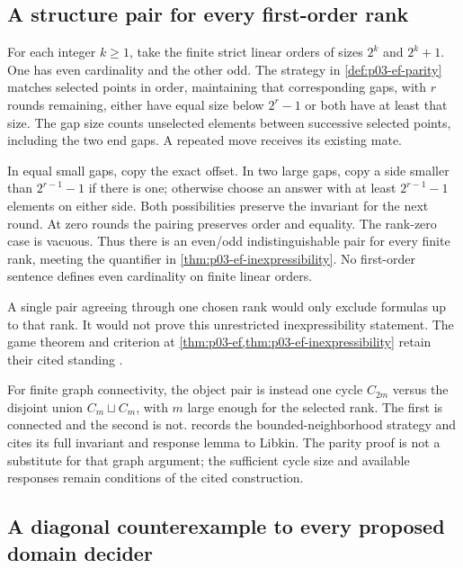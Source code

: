 \subsection{A structure pair for every first-order rank}
\label{sec:p14-counter-definability}

For each integer \(k\geq1\), take the finite strict linear orders of sizes
\(2^k\) and \(2^k+1\). One has even cardinality and the other odd.
The strategy in \cref{def:p03-ef-parity} matches selected points in order,
maintaining that corresponding gaps, with \(r\) rounds remaining, either
have equal size below \(2^r-1\) or both have at least that size.
The gap size counts unselected elements between successive selected points,
including the two end gaps. A repeated move receives its existing mate.

In equal small gaps, copy the exact offset. In two large gaps, copy a side
smaller than \(2^{r-1}-1\) if there is one; otherwise choose an answer
with at least \(2^{r-1}-1\) elements on either side. Both possibilities
preserve the invariant for the next round. At zero rounds the pairing
preserves order and equality. The rank-zero case is vacuous. Thus there is
an even/odd indistinguishable pair for every finite rank, meeting the
quantifier in \cref{thm:p03-ef-inexpressibility}. No first-order sentence
defines even cardinality on finite linear orders.

A single pair agreeing through one chosen rank would only exclude formulas
up to that rank. It would not prove this unrestricted inexpressibility
statement. The game theorem and criterion at
\cref{thm:p03-ef,thm:p03-ef-inexpressibility} retain their cited standing
\cite{Ehrenfeucht1961,Libkin2004}.

For finite graph connectivity, the object pair is instead one cycle
\(C_{2m}\) versus the disjoint union \(C_m\sqcup C_m\), with \(m\)
large enough for the selected rank. The first is connected and the second
is not.  records the bounded-neighborhood
strategy and cites its full invariant and response lemma to Libkin. The
parity proof is not a substitute for that graph argument; the sufficient
cycle size and available responses remain conditions of the cited construction.

\subsection{A diagonal counterexample to every proposed domain decider}
\label{sec:p14-counter-decidability}

